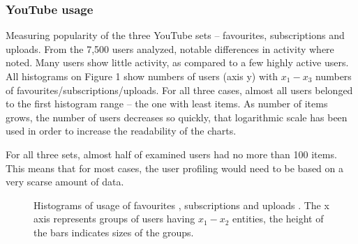 \subsubsection{YouTube usage}

Measuring popularity of the three YouTube sets -- favourites,
subscriptions and uploads. From the 7,500 users analyzed, notable differences in activity
where noted. Many users show little activity, as compared to a few highly active users.
All histograms on Figure 1 show numbers of users
(axis y) with $x_1-x_3$ numbers of favourites/subscriptions/uploads. For all
three cases, almost all users belonged to the first histogram range -- the one
with least items. As number of items grows, the number of users decreases so
quickly, that logarithmic scale has been used in order to increase the readability of the
charts.

For all three sets, almost half of examined users had no more than 100 items.
This means that for most cases, the user profiling would need to be based on a very
scarse amount of data.

\begin{figure}[htb]
  \centering
  \label{fig:subfigureExample}
  \caption{Histograms of usage of favourites , subscriptions
   and uploads . The x axis represents groups of
  users having $x_1-x_2$ entities, the height of the bars indicates sizes of the
  groups.}
\end{figure}


